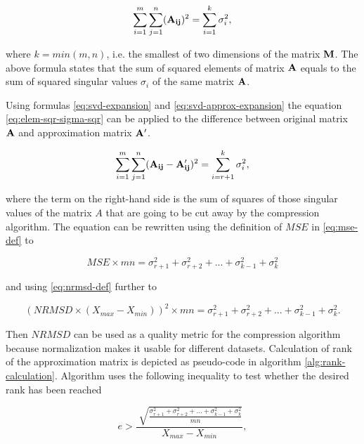 
\begin{equation}
\sum_{i=1}^{m} \sum_{j=1}^{n} (\mathbf{A_{ij}})^{2} = \sum_{i=1}^{k}{\sigma_{i}^{2}},
\label{eq:elem-sqr-sigma-sqr}
\end{equation}

where $k=min(m, n)$, i.e. the smallest of two dimensions of the matrix $\mathbf{M}$. The above formula states that the sum of squared elements of matrix $\mathbf{A}$ equals to the sum of squared singular values $\sigma_{i}$ of the same matrix $\mathbf{A}$.

Using formulas \eqref{eq:svd-expansion} and \eqref{eq:svd-approx-expansion} the equation \eqref{eq:elem-sqr-sigma-sqr} can be applied to the difference between original matrix $\mathbf{A}$ and approximation matrix $\mathbf{A'}$.

\begin{equation}
\sum_{i=1}^{m} \sum_{j=1}^{n} (\mathbf{A_{ij}} - \mathbf{A'_{ij}})^{2} = \sum_{i=r+1}^{k}{\sigma_{i}^{2}},
\end{equation}

where the term on the right-hand side is the sum of squares of those singular values of the matrix $A$ that are going to be cut away by the compression algorithm. The equation can be rewritten using the definition of $MSE$ in \eqref{eq:mse-def} to

\begin{equation}
MSE \times m n = \sigma_{r+1}^{2} + \sigma_{r+2}^{2} + ... + \sigma_{k-1}^{2} + \sigma_{k}^2
\end{equation}

and using \eqref{eq:nrmsd-def} further to

\begin{equation}
(NRMSD \times (X_{max}-X_{min}))^{2} \times m n = \sigma_{r+1}^{2} + \sigma_{r+2}^{2} + ... + \sigma_{k-1}^{2} + \sigma_{k}^2.
\end{equation}

Then $NRMSD$ can be used as a quality metric for the compression algorithm because normalization makes it usable for different datasets. Calculation of rank of the approximation matrix is depicted as pseudo-code in algorithm \ref{alg:rank-calculation}. Algorithm uses the following inequality to test whether the desired rank has been reached

\begin{equation}
e > \frac{\sqrt[]{\frac{\sigma_{r+1}^{2} + \sigma_{r+2}^{2} + ... + \sigma_{k-1}^{2} + \sigma_{k}^2}{m n}}}{X_{max}-X_{min}},
\end{equation}

